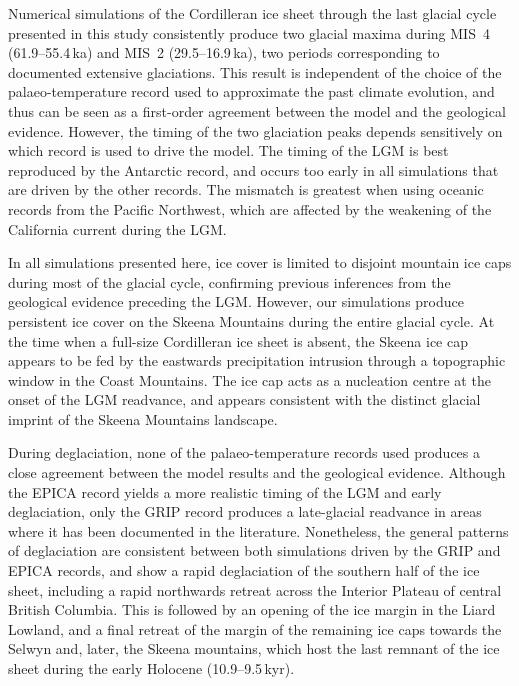 \documentclass[tc, manuscript]{copernicus}
\begin{document}
\conclusions
\label{sec:concl}

Numerical simulations of the Cordilleran ice sheet through the last glacial
cycle presented in this study consistently produce two glacial maxima during
MIS~4 (61.9--55.4\,ka) and MIS~2 (29.5--16.9\,ka), two periods
corresponding to documented extensive glaciations. This result is
independent of the choice of the palaeo-temperature record used to approximate
the past climate evolution, and thus
can be seen as a first-order agreement between the model and the geological
evidence. However, the timing of the two glaciation peaks depends sensitively
on which record
is used to drive the model. The timing of the LGM is best
reproduced by the Antarctic record, and occurs too early in all simulations
that are driven by the other records. The mismatch is greatest when using
oceanic records from the Pacific Northwest, which are affected by the
weakening of the California current during the LGM.

In all simulations presented here, ice cover is limited to disjoint mountain ice
caps during most of the glacial cycle, confirming previous inferences from the
geological evidence preceding the LGM. However, our
simulations produce persistent ice cover on the Skeena Mountains during
the entire glacial cycle. At the time when a full-size Cordilleran ice sheet is
absent, the Skeena ice cap appears to be fed by the eastwards precipitation
intrusion through a topographic window in the Coast Mountains. The ice cap acts
as a nucleation centre at the onset of the LGM readvance, and appears
consistent with the distinct glacial imprint of the Skeena Mountains landscape.

During deglaciation, none of the palaeo-temperature records used produces a
close agreement between the model results and the geological evidence. Although
the EPICA record yields a more realistic timing of the LGM and early
deglaciation, only the GRIP record produces a late-glacial readvance in areas
where it has been documented in the literature. Nonetheless, the
general patterns of deglaciation are consistent between both simulations driven
by the GRIP and EPICA records, and show a rapid deglaciation of the southern
half of the ice sheet, including a rapid northwards retreat across the Interior
Plateau of central British Columbia. This is followed by an opening of the ice
margin in the Liard Lowland, and a final retreat of the margin of the remaining
ice caps towards the Selwyn and, later, the Skeena mountains, which host the
last remnant of the ice sheet
during the early Holocene (10.9--9.5\,kyr).
\end{document}
